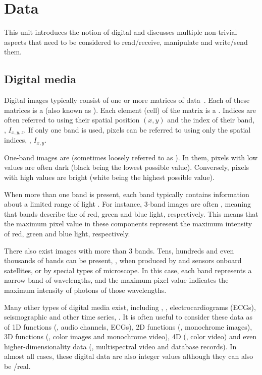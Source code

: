 \chapter{Data}\label{sec:data}

This unit introduces the notion of digital  and discusses multiple non-trivial aspects
that need to be considered to read/receive, manipulate and write/send them.

\section{Digital media}\label{sec:data:media}

Digital images typically consist of one or more matrices of  data~\cite{chua_data_representation}.
%
Each of these matrices is a  (also known as ).
Each element (cell) of the matrix is a . Indices are often referred to
using their spatial position $(x,y)$ and the index of their band, \eg, $I_{x,y,z}$.
If only one band is used, pixels can be referred to using only the spatial indices, \eg, $I_{x,y}$.

One-band images are  (sometimes loosely referred to as ).
In them, pixels with low values are often dark (black being the lowest possible value).
Conversely, pixels with high values are bright (white being the highest possible value).

When more than one band is present, each band typically contains information about a
limited range of light . For instance, $3$-band images are often ,
meaning that bands describe the  of red, green and blue light, respectively.
This means that the maximum pixel value in these components represent the maximum intensity
of red, green and blue light, respectively.

There also exist images with more than $3$ bands.
Tens, hundreds and even thousands of bands can be present, \eg,
when produced by  and  sensors onboard satellites,
or by special types of microscope. In this case,
each band represents a narrow band of wavelengths, and the maximum pixel value
indicates the maximum intensity of photons of those wavelengths.

Many other types of digital media exist, including , , electrocardiograms (ECGs),
seismographic and other time series, \etc. It is often useful to consider these data as  of
1D functions (\eg, audio channels, ECGs), 2D functions (\eg, monochrome images),
3D functions (\eg, color images and monochrome video), 4D (\eg, color video)
and even higher-dimensionality data (\eg, multispectral video and database records).
In almost all cases, these digital data are also integer values
although they can also be /real.

